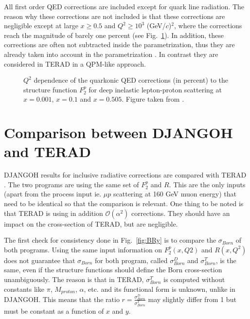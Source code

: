 All first order QED corrections are included except for quark line radiation. The reason why these corrections are not included is that these corrections are negligible except at large $x \geq 0.5$ and $Q^{2} \geq 10^3$ (GeV/$c$)$^2$, where the corrections reach the magnitude of barely one percent (see Fig.~\ref{fig:quarkline}). In addition, these corrections are often not subtracted inside the parametrization, thus they are already taken into account in the parametrization \cite{HubertF2Rad}. In contrast they are considered in TERAD in a QPM-like approach.

\begin{figure}[htb]
\centerline{}
\caption{$Q^2$ dependence of the quarkonic QED corrections (in percent) to the structure function $F^p_2$ for deep inelastic
lepton-proton scattering at $x=0.001$, $x=0.1$ and $x=0.505$. Figure taken from \cite{HubertF2Rad}.}\label{fig:quarkline}
\end{figure}


\section{Comparison between DJANGOH and TERAD}

DJANGOH results for inclusive radiative corrections are compared with TERAD \cite{TERAD}. The two programs are using the same set of $F^{p}_{2}$ and $R$. This are the only inputs (apart from the process input ie. $\mu p$ scattering at 160 GeV muon energy) that need to be identical so that the comparison is relevant. One thing to be noted is that TERAD is using in addition $\mathscr{O}(\alpha^2)$ corrections. They should have an impact on the cross-section of TERAD, but are negligible.

The first check for consistency done in Fig.~\ref{fig:BRy} is to compare the $\sigma_{Born}$ of both programs. Using the same input information on $F^{p}_{2}(x,Q2)$ and $R(x, Q^2)$ does not guarantee that $\sigma_{Born}$ for both program, called $\sigma^{D}_{Born}$ and $\sigma^{T}_{Born}$, is the same, even if the structure functions should define the Born cross-section unambiguously. The reason is that in TERAD, $\sigma^{T}_{Born}$ is computed without constants like $\pi$, $M_{proton}$, $\alpha$, etc. and its functional form is unknown, unlike in DJANGOH. This means that the ratio $r=\frac{\sigma^{D}_{Born}}{\sigma^{T}_{Born}}$ may slightly differ from 1 but must be constant as a function of $x$ and $y$.

